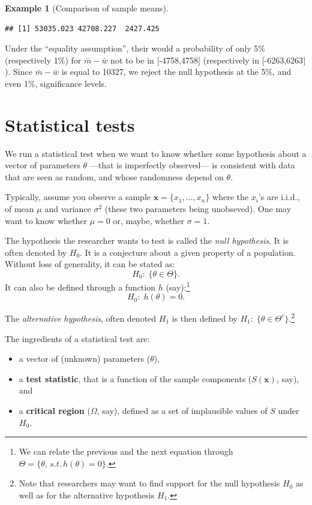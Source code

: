 \documentclass[
  12pt,
]{book}
\providecommand{\tightlist}{%
  \setlength{\itemsep}{0pt}\setlength{\parskip}{0pt}}
\theoremstyle{definition}
\theoremstyle{definition}
\newtheorem{example}{Example}[chapter]
\theoremstyle{definition}
\theoremstyle{definition}
\theoremstyle{remark}
\begin{document}
\begin{example}[Comparison of sample means]
\begin{verbatim}
## [1] 53035.023 42708.227  2427.425
\end{verbatim}

Under the ``equality assumption'', their would a probability of only 5\% (respectively 1\%) for \(\bar{m} - \bar{w}\) not to be in \([\)-4758,4758\(]\) (respectively in \([\)-6263,6263\(]\)). Since \(\bar{m} - \bar{w}\) is equal to 10327, we reject the null hypothesis at the 5\%, and even 1\%, significance levels.
\end{example}

\hypertarget{Tests}{%
\chapter{Statistical tests}\label{Tests}}

We run a statistical test when we want to know whether some hypothesis about a vector of parameters \(\theta\) ---that is imperfectly observed--- is consistent with data that are seen as random, and whose randomness depend on \(\theta\).

Typically, assume you observe a sample \(\mathbf{x}=\{x_1,\dots,x_n\}\) where the \(x_i\)'s are i.i.d., of mean \(\mu\) and variance \(\sigma^2\) (these two parameters being unobseved). One may want to know whether \(\mu=0\) or, maybe, whether \(\sigma = 1\).

The hypothesis the researcher wants to test is called the \emph{null hypothesis}. It is often denoted by \(H_0\). It is a conjecture about a given property of a population. Without loss of generality, it can be stated as:
\[
H_0:\;\{\theta \in \Theta\}.
\]
It can also be defined through a function \(h\) (say):\footnote{We can relate the previous and the next equation through \(\Theta = \{\theta, \,s.t.\,h(\theta)=0\}\).}
\[
H_0:\;h(\theta)=0.
\]

The \emph{alternative hypothesis}, often denoted \(H_1\) is then defined by \(H_1:\;\{\theta \in \Theta^c\}\).\footnote{Note that researchers may want to find support for the null hypothesis \(H_0\) as well as for the alternative hypothesis \(H_1\).}

The ingredients of a statistical test are:

\begin{itemize}
\tightlist
\item
  a vector of (unknown) parameters (\(\theta\)),
\item
  a \textbf{test statistic}, that is a function of the sample components (\(S(\mathbf{x})\), say), and
\item
  a \textbf{critical region} (\(\Omega\), say), defined as a set of implausible values of \(S\) under \(H_0\).
\end{itemize}
\end{document}
